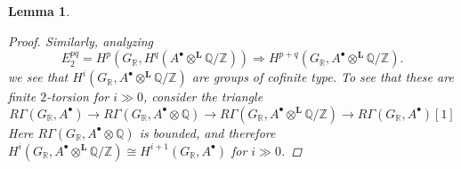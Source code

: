 \documentclass[leqno,12pt]{article}
\theoremstyle{plain}
\newtheorem{lemma}[theorem]{\indent\sc Lemma}
\theoremstyle{definition}
\newcommand{\QQ}{\mathbb{Q}}
\newcommand{\RR}{\mathbb{R}}
\newcommand{\ZZ}{\mathbb{Z}}
\begin{document}
\begin{lemma}
\begin{proof}
    Similarly, analyzing
    $$E_2^{pq} = H^p (G_\RR, H^q (A^\bullet \otimes^\mathbf{L} \QQ/\ZZ)) \Longrightarrow H^{p+q} (G_\RR, A^\bullet \otimes^\mathbf{L} \QQ/\ZZ).$$
    we see that $H^i (G_\RR, A^\bullet \otimes^\mathbf{L} \QQ/\ZZ)$ are groups of
    cofinite type. To see that these are finite $2$-torsion for $i \gg 0$,
    consider the triangle
    \[ R\Gamma (G_\RR, A^\bullet) \to
      R\Gamma (G_\RR, A^\bullet \otimes \QQ) \to
      R\Gamma (G_\RR, A^\bullet \otimes^\mathbf{L} \QQ/\ZZ) \to
      R\Gamma (G_\RR, A^\bullet) [1] \]
    Here $R\Gamma (G_\RR, A^\bullet \otimes \QQ)$ is bounded, and therefore
    $H^i (G_\RR, A^\bullet \otimes^\mathbf{L} \QQ/\ZZ) \cong H^{i+1} (G_\RR,
    A^\bullet)$ for $i \gg 0$.
  \end{proof}
\end{lemma}
\end{document}
